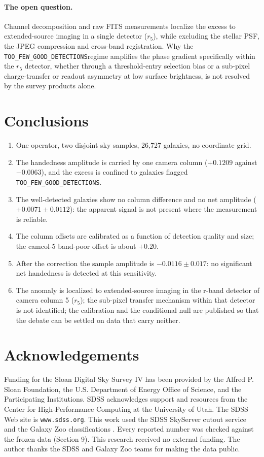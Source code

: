 \documentclass[linenumbers]{aa}
\newcommand{\toofew}{\texttt{TOO\_\allowbreak FEW\_\allowbreak GOOD\_\allowbreak DETECTIONS}}
\begin{document}
\paragraph{The open question.} Channel decomposition and raw FITS measurements localize the excess
to extended-source imaging in a single detector ($r_5$), while excluding the stellar PSF, the JPEG
compression and cross-band registration. Why the \toofew regime amplifies
the phase gradient specifically within the $r_5$ detector, whether through a threshold-entry
selection bias or a sub-pixel charge-transfer or readout asymmetry at low surface brightness, is not
resolved by the survey products alone.

\section{Conclusions}
\begin{enumerate}
\item One operator, two disjoint sky samples, 26,727 galaxies, no coordinate grid.
\item The handedness amplitude is carried by one camera column ($+0.1209$ against $-0.0063$), and
the excess is confined to galaxies flagged \toofew.
\item The well-detected galaxies show no column difference and no net amplitude
($+0.0071 \pm 0.0112$): the apparent signal is not present where the measurement is reliable.
\item The column offsets are calibrated as a function of detection quality and size; the camcol-5
band-poor offset is about $+0.20$.
\item After the correction the sample amplitude is $-0.0116 \pm 0.017$: no significant net
handedness is detected at this sensitivity.
\item The anomaly is localized to extended-source imaging in the r-band detector of camera column 5
($r_5$); the sub-pixel transfer mechanism within that detector is not identified; the calibration
and the conditional null are published so that the debate can be settled on data that carry
neither.
\end{enumerate}

\section*{Acknowledgements}
Funding for the Sloan Digital Sky Survey IV has been provided by the Alfred P. Sloan Foundation, the
U.S. Department of Energy Office of Science, and the Participating Institutions. SDSS acknowledges
support and resources from the Center for High-Performance Computing at the University of Utah. The
SDSS Web site is \texttt{www.sdss.org}. This work used the SDSS SkyServer cutout service
\citep{sdssdr18} and the Galaxy Zoo classifications \citep{lintott2008, masters2021}. Every reported number was checked against the frozen data (Section 9). This research received no external funding. The author thanks the SDSS and Galaxy Zoo teams for making the data
public.
\end{document}
